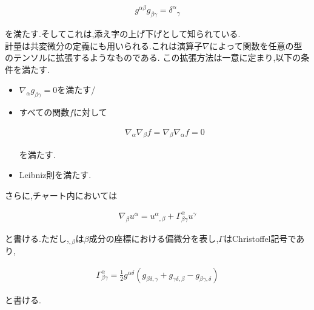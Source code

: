 \documentclass{jsarticle}
\begin{document}
\begin{align}
g^{\alpha\beta}g_{\beta\gamma}=\delta^\alpha{}_\gamma
\end{align}

を満たす.そしてこれは,添え字の上げ下げとして知られている.\\

計量は共変微分の定義にも用いられる.これは演算子$\nabla$によって関数を任意の型のテンソルに拡張するようなものである.
この拡張方法は一意に定まり,以下の条件を満たす.

\begin{itemize}
\item $\nabla_\alpha g_{\beta\gamma}=0$を満たす/

\item すべての関数$f$に対して

\begin{align}
\nabla_\alpha \nabla_\beta f=\nabla_\beta \nabla_\alpha f=0
\end{align}

を満たす.

\item  Leibniz則を満たす.

\end{itemize}

さらに,チャート内においては

\begin{align}
\nabla_\beta u^\alpha=u^\alpha{}_{,\beta}+\Gamma^\alpha_{\beta\gamma}u^\gamma
\end{align}

と書ける.ただし,${}_{,\beta}$は$\beta$成分の座標における偏微分を表し,$\Gamma$はChristoffel記号であり,

\begin{align}
\Gamma^\alpha_{\beta\gamma}=\frac{1}{2}g^{\alpha\delta}(g_{\beta\delta,\gamma}+g_{\gamma\delta,\beta}-g_{\beta\gamma,\delta})
\end{align}

と書ける.
\end{document}
